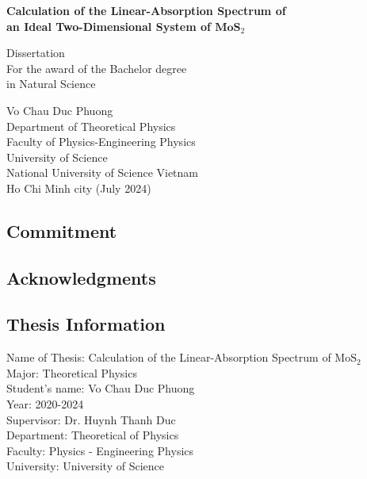 \documentclass[12pt,english,a4paper]{article}
\author{Vo Chau Duc Phuong}
\begin{document}
	\begin{titlepage}
		\begin{center}
			\vspace*{0.5cm}
			
			\Large
\textbf{Calculation of the Linear-Absorption Spectrum of\\ an Ideal Two-Dimensional System of $\mathrm{\textbf{MoS}}_2$}
			
			\vspace{5cm}
			
			\vspace{1.5cm}
			
			Dissertation\\
			For the award of the Bachelor degree\\
			in Natural Science
			
			\vfill
			
			\vspace{0.8cm}
			Vo Chau Duc Phuong\\
			Department of Theoretical Physics\\
			Faculty of Physics-Engineering Physics\\
			University of Science\\
			National University of Science
			Vietnam\\
			Ho Chi Minh city (July 2024)
			
		\end{center}
	\end{titlepage}
	\pagestyle{empty}
	\newpage
	\begin{center}
		\section*{Commitment}
	\end{center}
	\newpage
	\begin{center}
		\section*{Acknowledgments}
	\end{center}
	\newpage
	\pagestyle{plain}
	\tableofcontents
	\newpage
	\begin{center}
		\listoffigures
		\listoftables
	\end{center}
	\newpage
	\begin{center}
		\section*{Thesis Information}
	\end{center}
\quad Name of Thesis: Calculation of the Linear-Absorption Spectrum of $\mathrm{MoS}_2$\\\null
\quad Major: Theoretical Physics\\\null
\quad Student's name: Vo Chau Duc Phuong\\\null
\quad Year: 2020-2024\\\null
\quad Supervisor: Dr. Huynh Thanh Duc \\\null
\quad Department: Theoretical of Physics\\\null
\quad Faculty: Physics - Engineering Physics\\\null
\quad University: University of Science\\\null
\end{document}
